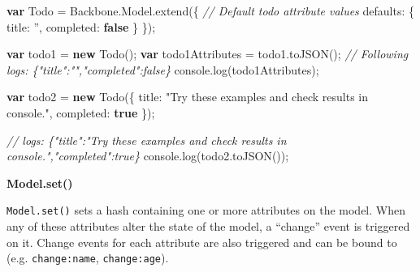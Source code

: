 \documentclass[9pt]{book}
\newenvironment{Shaded}{}{}
\newcommand{\KeywordTok}[1]{\textcolor[rgb]{0.00,0.44,0.13}{\textbf{{#1}}}}
\newcommand{\DataTypeTok}[1]{\textcolor[rgb]{0.56,0.13,0.00}{{#1}}}
\newcommand{\StringTok}[1]{\textcolor[rgb]{0.25,0.44,0.63}{{#1}}}
\newcommand{\CommentTok}[1]{\textcolor[rgb]{0.38,0.63,0.69}{\textit{{#1}}}}
\newcommand{\OtherTok}[1]{\textcolor[rgb]{0.00,0.44,0.13}{{#1}}}
\newcommand{\FunctionTok}[1]{\textcolor[rgb]{0.02,0.16,0.49}{{#1}}}
\newcommand{\NormalTok}[1]{{#1}}
\begin{document}
\begin{Shaded}
\begin{Highlighting}[]
\KeywordTok{var} \NormalTok{Todo = }\OtherTok{Backbone}\NormalTok{.}\OtherTok{Model}\NormalTok{.}\FunctionTok{extend}\NormalTok{(\{}
  \CommentTok{// Default todo attribute values}
  \DataTypeTok{defaults}\NormalTok{: \{}
    \DataTypeTok{title}\NormalTok{: }\StringTok{''}\NormalTok{,}
    \DataTypeTok{completed}\NormalTok{: }\KeywordTok{false}
  \NormalTok{\}}
\NormalTok{\});}

\KeywordTok{var} \NormalTok{todo1 = }\KeywordTok{new} \FunctionTok{Todo}\NormalTok{();}
\KeywordTok{var} \NormalTok{todo1Attributes = }\OtherTok{todo1}\NormalTok{.}\FunctionTok{toJSON}\NormalTok{();}
\CommentTok{// Following logs: \{"title":"","completed":false\} }
\OtherTok{console}\NormalTok{.}\FunctionTok{log}\NormalTok{(todo1Attributes);}

\KeywordTok{var} \NormalTok{todo2 = }\KeywordTok{new} \FunctionTok{Todo}\NormalTok{(\{}
  \DataTypeTok{title}\NormalTok{: }\StringTok{"Try these examples and check results in console."}\NormalTok{,}
  \DataTypeTok{completed}\NormalTok{: }\KeywordTok{true}
\NormalTok{\});}

\CommentTok{// logs: \{"title":"Try these examples and check results in console.","completed":true\}}
\OtherTok{console}\NormalTok{.}\FunctionTok{log}\NormalTok{(}\OtherTok{todo2}\NormalTok{.}\FunctionTok{toJSON}\NormalTok{());}
\end{Highlighting}
\end{Shaded}

\textbf{Model.set()}

\texttt{Model.set()} sets a hash containing one or more attributes on
the model. When any of these attributes alter the state of the model, a
``change'' event is triggered on it. Change events for each attribute
are also triggered and can be bound to (e.g. \texttt{change:name},
\texttt{change:age}).
\end{document}
